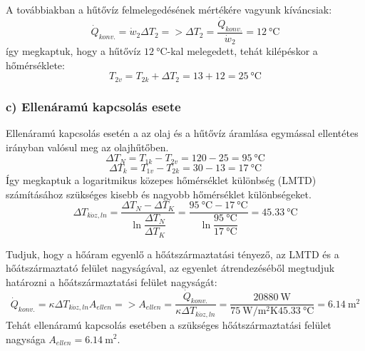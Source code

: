 A továbbiakban a hűtővíz felmelegedésének mértékére vagyunk kíváncsiak: 
\begin{equation}
\dot{Q}_{konv.} = \dot{w}_2 \Delta T_2 => \Delta T_2 = \dfrac {\dot{Q}_{konv.}}{\dot{w}_2} =\SI{12}{\celsius}
\end{equation}
így megkaptuk, hogy a hűtővíz $\SI{12}{\celsius}$-kal melegedett, tehát kilépéskor a hőmérséklete:
\begin{equation}
T_{2v} = T_{2k} + \Delta T_2 = 13 + 12 =\SI{25}{\celsius}
\end{equation}

\subsubsection*{c) Ellenáramú kapcsolás esete }
Ellenáramú kapcsolás esetén a az olaj és a hűtővíz áramlása egymással ellentétes irányban valósul meg az olajhűtőben. 
\begin{equation}
\Delta T_N =  T_{1k} - T_{2v} = 120 - 25 =\SI{95}{\celsius}
\end{equation}
\begin{equation}
\Delta T_k =  T_{1v} - T_{2k} = 30 - 13 =\SI{17}{\celsius}
\end{equation}
Így megkaptuk a logaritmikus közepes hőmérséklet különbség (LMTD) számításához szükséges  kisebb és nagyobb hőmérséklet különbségeket.
\begin{equation}
\Delta T_{k\ddot{o}z,ln} 
= 
\dfrac{\Delta T_N - \Delta T_K}{\ln\dfrac{\Delta T_N}{\Delta T_K}} 
= 
\dfrac{\SI{95}{\celsius} - \SI{17}{\celsius}}{\ln\dfrac{\SI{95}{\celsius}}{\SI{17}{\celsius}}} 
= 
\SI{45,33}{\celsius}
\end{equation}

Tudjuk, hogy a hőáram egyenlő a hőátszármaztatási tényező, az LMTD és a hőátszármaztató felület nagyságával, az egyenlet átrendezéséből megtudjuk határozni a hőátszármaztatási felület nagyságát:
\begin{equation}
\dot{Q}_{konv.} = \kappa \Delta T_{k\ddot{o}z,ln} A_{ellen} => A_{ellen} = \dfrac{\dot{Q}_{konv.}}{\kappa \Delta T_{k\ddot{o}z,ln}} = \dfrac{\SI{20880}{\watt}}{\SI{75}{\watt\per\meter\squared\kelvin} \SI{45,33}{\celsius}} = \SI{6,14}{\meter\squared}
\end{equation}
Tehát ellenáramú kapcsolás esetében a szükséges hőátszármaztatási felület nagysága $A_{ellen} = \SI{6,14}{\meter\squared}$.

